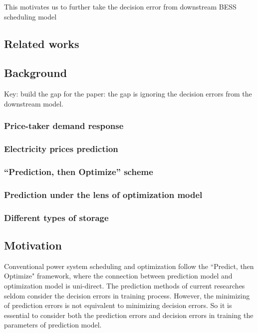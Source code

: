 \documentclass[journal]{IEEEtran}
\newcommand{\slw}{\color{blue}}
\begin{document}
This motivates us to further take the decision error from downstream BESS scheduling model  

\subsection{Related works}

\subsection{Background}

{\slw Key: build the gap for the paper: the gap is ignoring the decision errors from the downstream model.}

\subsubsection{Price-taker demand response}

\subsubsection{Electricity prices prediction}

\subsubsection{``Prediction, then Optimize'' scheme}

\subsubsection{Prediction under the lens of optimization model}

\subsubsection{Different types of storage}

\subsection{Motivation}

Conventional power system scheduling and optimization follow the ``Predict, then Optimize" framework, where the connection between prediction model and optimization model is uni-direct. The prediction methods of current researches seldom consider the decision errors in training process. However, the minimizing of prediction errors is not equivalent to minimizing decision errors. So it is essential to consider both the prediction errors and decision errors in training the parameters of prediction model. 
\end{document}
